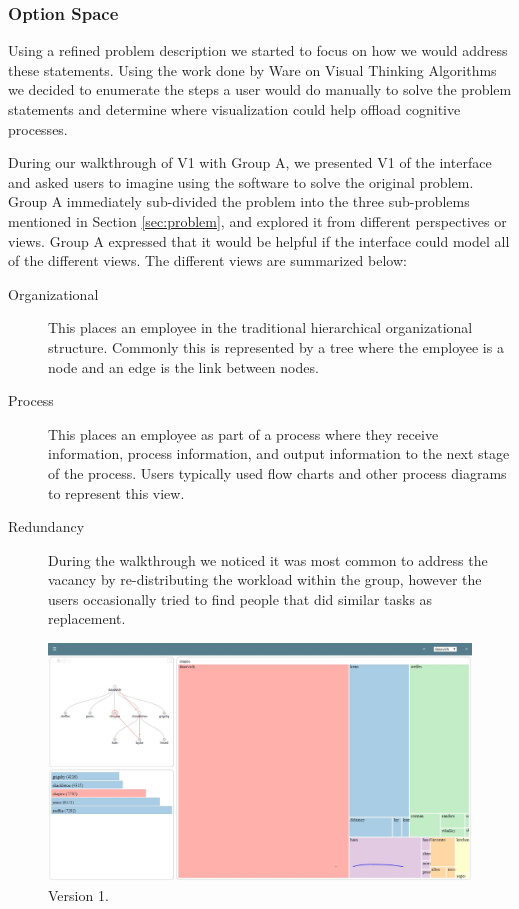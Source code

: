 \documentclass[journal]{vgtc}                %
\begin{document}
\subsubsection{Option Space}
Using a refined problem description we started to focus on how we would address these statements.  Using the work done by Ware on Visual Thinking Algorithms~\cite[Chapter 11]{ware2012information} we decided to enumerate the steps a user would do manually to solve the problem statements and determine where visualization could help offload cognitive processes.

During our walkthrough of V1 with Group A, we presented V1 of the interface and asked users to imagine using the software to solve the original problem. Group A immediately sub-divided the problem into the three sub-problems mentioned in Section \ref{sec:problem}, and explored it from different perspectives or views. Group A expressed that it would be helpful if the interface could model all of the different views. The different views are summarized below:

\begin{description}
\item [Organizational] This places an employee in the traditional hierarchical organizational structure.  Commonly this is represented by a tree where the employee is a node and an edge is the link between nodes.
\item [Process] This places an employee as part of a process where they receive information, process information, and output information to the next stage of the process.  Users typically used flow charts and other process diagrams to represent this view.
\item [Redundancy] During the walkthrough we noticed it was most common to address the vacancy by re-distributing the workload within the group, however the users occasionally tried to find people that did similar tasks as replacement.
\end{description}
\begin{figure}
  \centering
  \includegraphics[width=\columnwidth]{pictures/version1.JPG}
  \caption{Version 1. }
  \label{fig:version1}
\end{figure}
      
\end{document}
